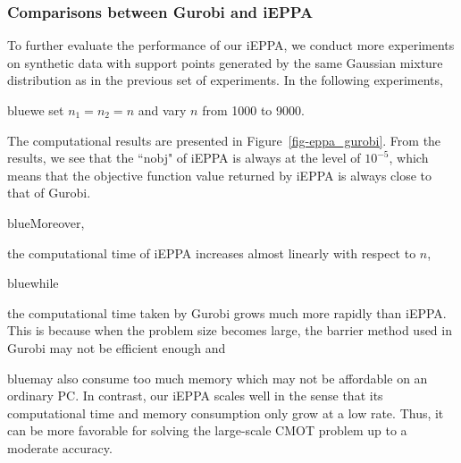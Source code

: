 \documentclass[10pt]{article}
\newcommand{\blue}[1]{\begin{color}{blue}#1\end{color}}
\begin{document}
\subsubsection{Comparisons between Gurobi and iEPPA}\label{subsecEG}

To further evaluate the performance of our iEPPA, we conduct more experiments on synthetic data with support points generated by the same Gaussian mixture distribution as in the previous set of experiments. In the following experiments, \blue{we set $n_1=n_2=n$ and vary $n$ from 1000 to 9000.} The computational results are presented in Figure~\ref{fig-eppa_gurobi}. From the results, we see that the ``nobj" of iEPPA is always at the level of $10^{-5}$, which means that the objective function value returned by iEPPA is always close to that of Gurobi.
\blue{Moreover,} the computational time of iEPPA increases almost linearly with respect to $n$, \blue{while} the computational time taken by Gurobi grows much more rapidly than iEPPA. This is because when the problem size becomes large, the barrier method used in Gurobi may not be efficient enough and \blue{may also consume too much memory which may not be affordable on an ordinary PC.
In contrast, our iEPPA scales well in the sense that its computational time and memory consumption only grow at a low rate. Thus, it can be more favorable for solving the large-scale CMOT problem up to a moderate accuracy.}
\end{document}
